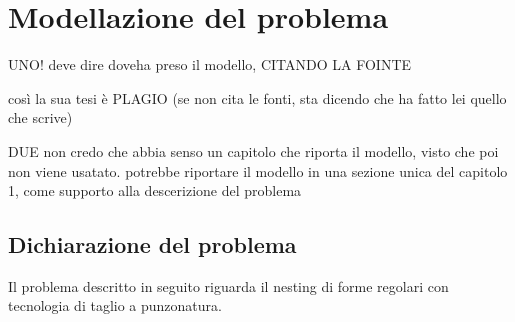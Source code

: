 \chapter{Modellazione del problema}
\label{cap:analisi-requisiti}


UNO! deve dire doveha preso il modello, CITANDO LA FOINTE

così la sua tesi è PLAGIO (se non cita le fonti, sta dicendo che ha fatto lei quello che scrive)

DUE
non credo che abbia senso un capitolo che riporta il modello, visto che poi non viene usatato. potrebbe riportare il modello in una sezione unica del capitolo 1, come supporto alla descerizione del problema

\section{Dichiarazione del problema}

Il problema descritto in seguito riguarda il nesting di forme regolari con tecnologia di taglio a punzonatura.

